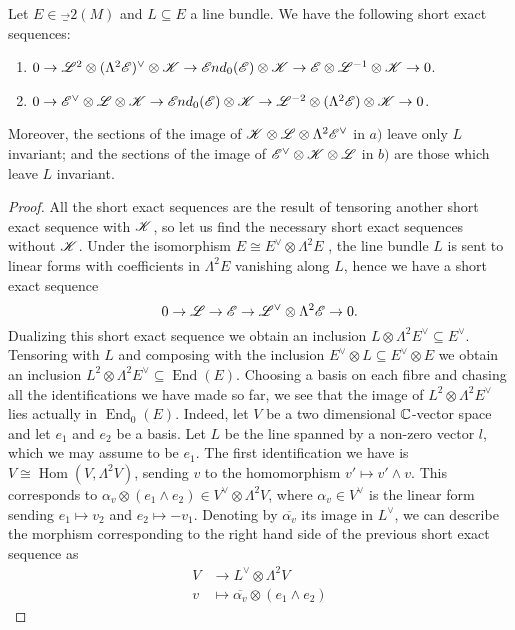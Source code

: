 \documentclass[A4paper, 12pt, british, reqno]{amsart}
\DeclareMathOperator{\Hom}{Hom}
\DeclareMathOperator{\End}{End}
\newcommand{\ot}{\otimes}
\newcommand{\dual}{^{\vee}}
\begin{document}
\begin{lm}\label{lm:linearalgebra}
    Let $E\in \Vec_{2}(M)$ and $L\subseteq E$ a line bundle.
    We have the following short exact sequences:
    \begin{enumerate}[label=\alph*)]
	\item $0\to \L^{2}\ot (\Lambda^{2}\E)\dual \ot \sK \to \sEnd_{0}(\E)\ot \sK\to \E\ot \L^{-1}\ot \sK\to 0$.
	\item $0\to \E\dual \ot \L\ot \sK\to \sEnd_{0}(\E)\ot \sK \to \L^{-2}\ot (\Lambda^{2}\E)\ot \sK\to 0$.
    \end{enumerate}
    Moreover, the sections of the image of $\sK\ot \L\ot \Lambda^{2}\E\dual$ in $a)$ leave only $L$ invariant; and the sections of the image of $\E\dual\ot \sK\ot\L$ in $b)$ are those which leave $L$ invariant.
    \begin{proof}
	All the short exact sequences are the result of tensoring another short exact sequence with $\mathscr{K}$, so let us find the necessary short exact sequences without $\mathscr{K}$.
	Under the isomorphism $E\cong E\dual \ot \Lambda^{2}E$ \cite[Exercise II.5.16]{har77}, the line bundle $L$ is sent to linear forms with coefficients in $\Lambda^{2}E$ vanishing along $L$, hence we have a short exact sequence
	\[ 0\to \L\to \E\to \L\dual \ot \Lambda^{2}\E\to 0. \]
	Dualizing this short exact sequence we obtain an inclusion $L\ot \Lambda^{2}E\dual \subseteq E\dual$.
	Tensoring with $L$ and composing with the inclusion $E\dual\ot L\subseteq E\dual \ot E$ we obtain an inclusion $L^{2}\ot \Lambda^{2}E\dual \subseteq \End(E)$.
	Choosing a basis on each fibre and chasing all the identifications we have made so far, we see that the image of $L^{2}\ot \Lambda^{2}E\dual$ lies actually in $\End_{0}(E)$.
	Indeed, let $V$ be a two dimensional $\mathbb{C}$-vector space and let $e_{1}$ and $e_{2}$ be a basis.
	Let $L$ be the line spanned by a non-zero vector $l$, which we may assume to be $e_{1}$.
	The first identification we have is $V\cong \Hom(V,\Lambda^{2}V)$, sending $v$ to the homomorphism $v'\mapsto v'\wedge v$.
	This corresponds to $\alpha_{v}\ot (e_{1}\wedge e_{2})\in V\dual\ot\Lambda^{2}V$, where $\alpha_{v}\in V\dual$ is the linear form sending $e_{1}\mapsto v_{2}$ and $e_{2}\mapsto -v_{1}$.
	Denoting by $\overline{\alpha_{v}}$ its image in $L\dual$, we can describe the morphism corresponding to the right hand side of the previous short exact sequence as
	\begin{align*}
	    V &\longrightarrow L\dual \ot \Lambda^{2}V \\
	    v &\longmapsto \overline{\alpha_{v}}\ot (e_{1}\wedge e_{2})

\end{align*}
\end{proof}
\end{lm}
\end{document}
